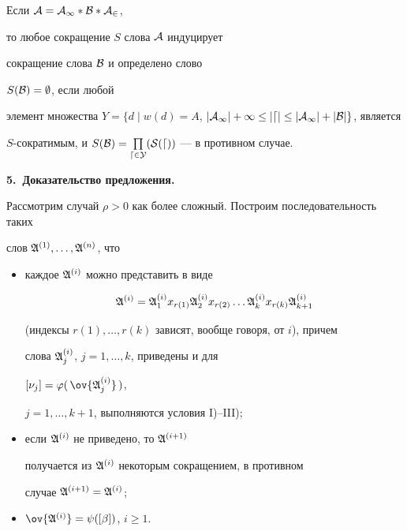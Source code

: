 Если $\cal A=\cal A_1*\cal B*\cal A_2$,


то любое сокращение $S$ слова $\cal A$ индуцирует 


сокращение слова $\cal B$ и определено слово


$S(\cal B)=\emptyset$, если любой


элемент множества $Y=\{d\mid w(d)=A$, $|\cal A_1|+1\le |d|\le


|\cal A_1|+|\cal B|\}$, является


$S$-сократимым, и $S(\cal B)=\prod\limits_{d\in Y}(S(d))$ --- в противном случае.


\medskip





{\bf 5.~Доказательство предложения.}


Рассмотрим случай $\rho>0$ как более сложный. Построим последовательность таких 


слов $\frak A^{(1)},\dotsc,\frak A^{(n)}$, что


\begin{itemize}


\item[a)] каждое $\frak A^{(i)} $ можно представить в виде


\begin{equation}


\frak A^{(i)}=\frak A^{(i)}_1 x_{r(1)}


\frak A^{(i)}_2 x_{r(2)} \dotsc


\frak A^{(i)}_k x_{r(k)}\frak A^{(i)}_{k+1}


\label{(17.11)}


\end{equation}


(индексы $r(1),\dotsc,r(k)$ зависят, вообще говоря, от $i$), причем


слова $\frak A^{(i)}_j$, $j=1,\dotsc,k$, приведены и для 


$[\nu_j]=\varphi(\,\ov{\frak A^{(i)}_j}\,)$,


$j=1,\dotsc,k+1$, выполняются условия I)--III);


\item[b)] если $\frak A^{(i)}$ не приведено, то $\frak A^{(i+1)}$


получается из $\frak A^{(i)}$ некоторым сокращением, в противном


случае $\frak A^{(i+1)}=\frak A^{(i)}$;


\item[c)] $\ov{\frak A^{(i)}}=\psi([\beta])$, $i\ge 1$.


\end{itemize}





